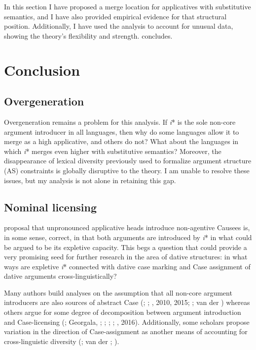 \documentclass[output=paper]{langscibook}
\begin{document}
In this section I have proposed a merge location for applicatives with substitutive semantics, and I have also provided empirical evidence for that structural position. Additionally, I have used the analysis to account for unusual data, showing the theory’s flexibility and strength.  concludes. 

\section{Conclusion}\label{sec:wechsler:4}

\subsection{Overgeneration}\label{sec:wechsler:4.1}

Overgeneration remains a problem for this analysis. If \textit{i}* is the sole non-core argument introducer in all languages, then why do some languages allow it to merge as a high applicative, and others do not? What about the languages in which \textit{i}* merges even higher with substitutive semantics? Moreover, the disappearance of lexical diversity previously used to formalize argument structure (AS) constraints is globally disruptive to the theory. I am unable to resolve these issues, but my analysis is not alone in retaining this gap.

\subsection{Nominal licensing}\label{sec:wechsler:4.2}

 proposal that unpronounced applicative heads introduce non-agentive Causees is, in some sense, correct, in that both arguments are introduced by \textit{i}* in what could be argued to be its expletive capacity. This begs a question that could provide a very promising seed for further research in the area of dative structures: in what ways are expletive \textit{i}* connected with dative case marking and Case assignment of dative arguments cross-linguistically? 



Many authors build analyses on the assumption that all non-core argument introducers are also sources of abstract Case (\citealt{MchomboFirmino1999}; \citealt{Jeong2007}; \citealt{Cuervo2003}, 2010, 2015; \citealt{Sheehan2013}; van der \citealt{Wal2017}) whereas others argue for some degree of decomposition between argument introduction and Case-licensing (\citealt{BakerCollins2006}; Georgala, \citealt{PaulWhitman2008}; \citealt{Georgala2012}; \citealt{HaddicanHolmberg2012}; \citealt{Halpert2012}; \citealt{Wechsler2014}, 2016). Additionally, some scholars propose variation in the direction of Case-assignment as another means of accounting for cross-linguistic diversity (\citealt{Sheehan2013}; van der \citealt{Wal2017}; \citealt{Baker2008}). 
\end{document}
